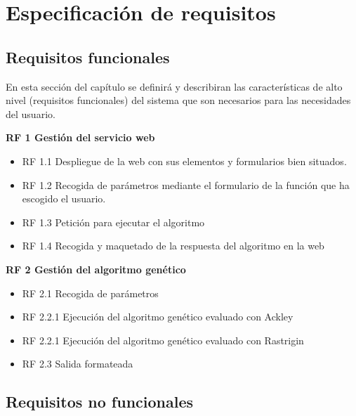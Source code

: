 \newpage
\section{Especificación de requisitos}

\subsection{Requisitos funcionales}

\bigskip
En esta sección del capítulo se definirá y describiran las características de alto nivel (requisitos funcionales) del sistema que son necesarios para las necesidades del usuario.

\bigskip
\textbf{RF 1 Gestión del servicio web}

\begin{itemize}
	\item RF 1.1 Despliegue de la web con sus elementos y formularios bien situados.
	
	\item RF 1.2 Recogida de parámetros mediante el formulario de la función que ha escogido el usuario.
	
	\item RF 1.3 Petición para ejecutar el algoritmo 
	
	\item RF 1.4 Recogida y maquetado de la respuesta del algoritmo en la web
\end{itemize}

\textbf{RF 2 Gestión del algoritmo genético}

\begin{itemize}
	\item RF 2.1 Recogida de parámetros
	
	\item RF 2.2.1 Ejecución del algoritmo genético evaluado con Ackley
	
	\item RF 2.2.1 Ejecución del algoritmo genético evaluado con Rastrigin
	
	\item RF 2.3 Salida formateada
\end{itemize}






\subsection{Requisitos no funcionales}

